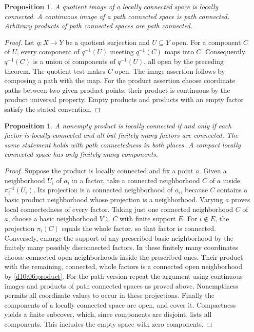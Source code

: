 \documentclass[11pt,oneside,openany]{book}
\newtheorem{proposition}[theorem]{Proposition}
\theoremstyle{definition}
\theoremstyle{remark}
\begin{document}
\begin{proposition}\label{d10:06:local-quotients}
A quotient image of a locally connected space is locally connected. A continuous image of a path connected space is path connected. Arbitrary products of path connected spaces are path connected.
\end{proposition}
\begin{proof}
Let $q:X\to Y$ be a quotient surjection and $U\subseteq Y$ open. For a component $C$ of $U$, every component of $q^{-1}(U)$ meeting $q^{-1}(C)$ maps into $C$. Consequently $q^{-1}(C)$ is a union of components of $q^{-1}(U)$, all open by the preceding theorem. The quotient test makes $C$ open. The image assertion follows by composing a path with the map. For the product assertion choose coordinate paths between two given product points; their product is continuous by the product universal property. Empty products and products with an empty factor satisfy the stated convention.
\end{proof}

\begin{proposition}\label{d10:06:local-products}
A nonempty product is locally connected if and only if each factor is locally connected and all but finitely many factors are connected. The same statement holds with path connectedness in both places. A compact locally connected space has only finitely many components.
\end{proposition}
\begin{proof}
Suppose the product is locally connected and fix a point $a$. Given a neighborhood $U_i$ of $a_i$ in a factor, take a connected neighborhood $C$ of $a$ inside $\pi_i^{-1}(U_i)$. Its projection is a connected neighborhood of $a_i$, because $C$ contains a basic product neighborhood whose projection is a neighborhood. Varying $a$ proves local connectedness of every factor. Taking just one connected neighborhood $C$ of $a$, choose a basic neighborhood $V\subseteq C$ with finite support $E$. For $i\notin E$, the projection $\pi_i(C)$ equals the whole factor, so that factor is connected. Conversely, enlarge the support of any prescribed basic neighborhood by the finitely many possibly disconnected factors. In these finitely many coordinates choose connected open neighborhoods inside the prescribed ones. Their product with the remaining, connected, whole factors is a connected open neighborhood by \cref{d10:06:product}. For the path version repeat the argument using continuous images and products of path connected spaces as proved above. Nonemptiness permits all coordinate values to occur in these projections. Finally the components of a locally connected space are open, and cover it. Compactness yields a finite subcover, which, since components are disjoint, lists all components. This includes the empty space with zero components.
\end{proof}
\end{document}
